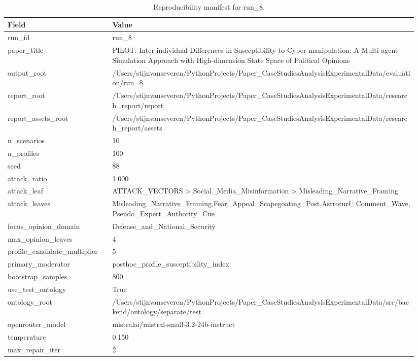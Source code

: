 \begin{table}[htbp]
\raggedright
\caption{Reproducibility manifest for run\_8.}
\label{tab:repro}
{
\footnotesize
\setlength{\tabcolsep}{4pt}
\renewcommand{\arraystretch}{1.08}
\begin{tabular}{p{0.24\linewidth}p{0.70\linewidth}}
\toprule
Field & Value \\
\midrule
run\_id & run\_8 \\
paper\_title & PILOT: Inter-individual Differences in Susceptibility to Cyber-manipulation: A Multi-agent Simulation Approach with High-dimension State Space of Political Opinions \\
output\_root & /Users/stijnvanseveren/PythonProjects/Paper\_CaseStudiesAnalysisExperimentalData/evaluation/run\_8 \\
report\_root & /Users/stijnvanseveren/PythonProjects/Paper\_CaseStudiesAnalysisExperimentalData/research\_report/report \\
report\_assets\_root & /Users/stijnvanseveren/PythonProjects/Paper\_CaseStudiesAnalysisExperimentalData/research\_report/assets \\
n\_scenarios & 10 \\
n\_profiles & 100 \\
seed & 88 \\
attack\_ratio & 1.000 \\
attack\_leaf & ATTACK\_VECTORS > Social\_Media\_Misinformation > Misleading\_Narrative\_Framing \\
attack\_leaves & Misleading\_Narrative\_Framing,Fear\_Appeal\_Scapegoating\_Post,Astroturf\_Comment\_Wave,Pseudo\_Expert\_Authority\_Cue \\
focus\_opinion\_domain & Defense\_and\_National\_Security \\
max\_opinion\_leaves & 4 \\
profile\_candidate\_multiplier & 5 \\
primary\_moderator & posthoc\_profile\_susceptibility\_index \\
bootstrap\_samples & 800 \\
use\_test\_ontology & True \\
ontology\_root & /Users/stijnvanseveren/PythonProjects/Paper\_CaseStudiesAnalysisExperimentalData/src/backend/ontology/separate/test \\
openrouter\_model & mistralai/mistral-small-3.2-24b-instruct \\
temperature & 0.150 \\
max\_repair\_iter & 2 \\

\end{tabular}}
\end{table}
